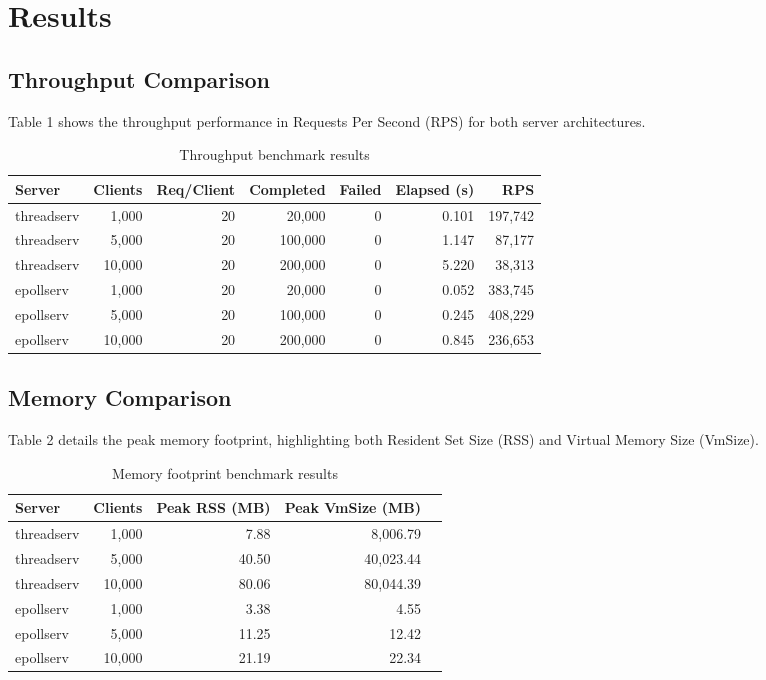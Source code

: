 \documentclass[11pt,a4paper]{article}
\begin{document}
\section{Results}

\subsection{Throughput Comparison}
Table 1 shows the throughput performance in Requests Per Second (RPS) for both server architectures.

\begin{table}[h]
\centering
\begin{tabular}{lrrrrrr}
\toprule
\textbf{Server} & \textbf{Clients} & \textbf{Req/Client} & \textbf{Completed} & \textbf{Failed} & \textbf{Elapsed (s)} & \textbf{RPS} \\
\midrule
threadserv & 1,000  & 20 & 20,000  & 0 & 0.101 & 197,742 \\
threadserv & 5,000  & 20 & 100,000 & 0 & 1.147 & 87,177  \\
threadserv & 10,000 & 20 & 200,000 & 0 & 5.220 & 38,313  \\
\midrule
epollserv  & 1,000  & 20 & 20,000  & 0 & 0.052 & 383,745 \\
epollserv  & 5,000  & 20 & 100,000 & 0 & 0.245 & 408,229 \\
epollserv  & 10,000 & 20 & 200,000 & 0 & 0.845 & 236,653 \\
\bottomrule
\end{tabular}
\caption{Throughput benchmark results}
\end{table}

\subsection{Memory Comparison}
Table 2 details the peak memory footprint, highlighting both Resident Set Size (RSS) and Virtual Memory Size (VmSize).

\begin{table}[h]
\centering
\begin{tabular}{lrrrr}
\toprule
\textbf{Server} & \textbf{Clients} & \textbf{Peak RSS (MB)} & \textbf{Peak VmSize (MB)} \\
\midrule
threadserv & 1,000  & 7.88  & 8,006.79  \\
threadserv & 5,000  & 40.50 & 40,023.44 \\
threadserv & 10,000 & 80.06 & 80,044.39 \\
\midrule
epollserv  & 1,000  & 3.38  & 4.55  \\
epollserv  & 5,000  & 11.25 & 12.42 \\
epollserv  & 10,000 & 21.19 & 22.34 \\
\bottomrule
\end{tabular}
\caption{Memory footprint benchmark results}
\end{table}
\end{document}
